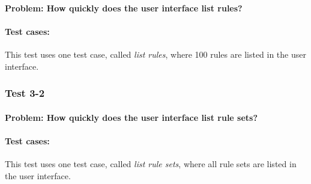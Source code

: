 \paragraph{Problem: How quickly does the user interface list rules?}
\paragraph{Test cases:}
This test uses one test case, called {\em list rules}, where 100 rules are
listed in the user interface.

\subsubsection{Test 3-2}
\paragraph{Problem: How quickly does the user interface list rule sets?}
\paragraph{Test cases:}
This test uses one test case, called {\em list rule sets}, where all rule sets
are listed in the user interface.
